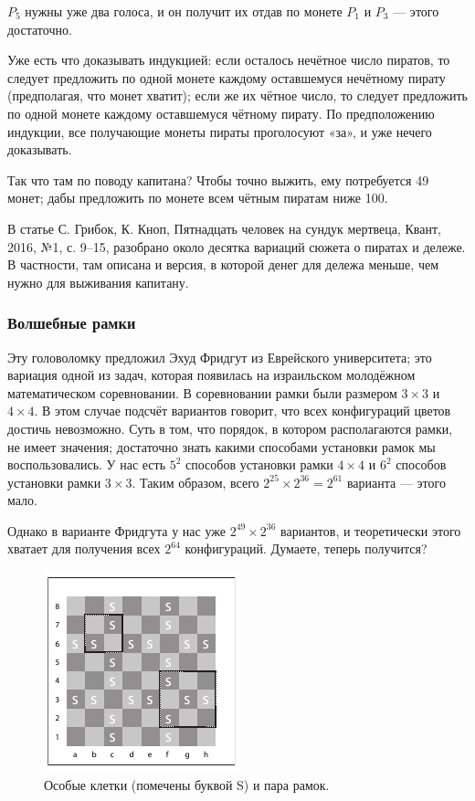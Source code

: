 $P_5$ нужны уже два голоса, и он получит их отдав по монете $P_1$ и $P_3$ --- этого достаточно.

Уже есть что доказывать индукцией:
если осталось нечётное число пиратов, то следует предложить по одной монете каждому оставшемуся нечётному пирату (предполагая, что монет хватит);
если же их чётное число, то следует предложить по одной монете каждому оставшемуся чётному пирату.
По предположению индукции, все получающие монеты пираты проголосуют «за», и уже нечего доказывать.

Так что там по поводу капитана?
Чтобы точно выжить, ему потребуется 49 монет; дабы предложить по монете всем чётным пиратам ниже 100.

\begin{addedbytheeditors}
   В статье  С. Грибок, К. Кноп, Пятнадцать человек на сундук мертвеца, Квант, 2016, №1, с. 9–15, разобрано около десятка вариаций сюжета о пиратах и дележе. В частности, там описана и версия, в которой денег для дележа меньше, чем нужно для выживания капитану.
\end{addedbytheeditors}


\subsubsection*{Волшебные рамки}

Эту головоломку предложил Эхуд Фридгут из Еврейского университета; это вариация одной из задач, которая появилась на израильском молодёжном математическом соревновании.
В соревновании рамки были размером $3 \times 3$ и $4 \times 4$.
В этом случае подсчёт вариантов говорит, что всех конфигураций цветов достичь невозможно.
Суть в том, что порядок, в котором располагаются рамки, не имеет значения;
достаточно знать какими способами установки рамок мы воспользовались.
У нас есть $5^2$ способов установки рамки $4 \times 4$
и $6^2$ способов установки рамки $3 \times 3$.
Таким образом, всего $2^{25} \times 2^{36} = 2^{61}$ варианта — этого мало.

Однако в варианте Фридгута у нас уже $2^{49} \times 2^{36}$ вариантов, и теоретически этого хватает для получения всех $2^{64}$ конфигураций.
Думаете, теперь получится?

\begin{figure}[ht!]
\centering
\includegraphics[scale=1]{pics/chess}
\caption{Особые клетки (помечены буквой S) и пара рамок.}
\label{pic:chess1}
\end{figure}

